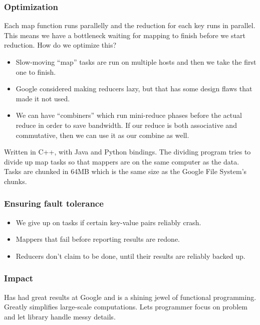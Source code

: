 \documentclass{scrartcl}
\begin{document}
\subsubsection*{Optimization}
Each map function runs parallelly and the reduction for each key runs in parallel.
This means we have a bottleneck waiting for mapping to finish before we start
reduction. How do we optimize this?
\begin{itemize}
\item Slow-moving ``map'' tasks are run on multiple hosts and then we take the
	first one to finish.
\item Google considered making reducers lazy, but that has some design flaws
	that made it not used.
\item We can have ``combiners'' which run mini-reduce phases before the actual
	reduce in order to save bandwidth. If our reduce is both associative and
	commutative, then we can use it as our combine as well.
\end{itemize}

Written in C++, with Java and Python bindings. The dividing program tries
to divide up map tasks so that mappers are on the same computer as the data.
Tasks are chunked in 64MB which is the same size as the Google File System's
chunks.

\subsubsection*{Ensuring fault tolerance}
\begin{itemize}
\item We give up on tasks if certain key-value pairs reliably crash.
\item Mappers that fail before reporting results are redone.
\item Reducers don't claim to be done, until their results are reliably backed
	up.
\end{itemize}
\subsubsection*{Impact}
Has had great results at Google and is a shining jewel of functional programming.
Greatly simplifies large-scale computations. Lets programmer focus on problem
and let library handle messy details.
\end{document}
